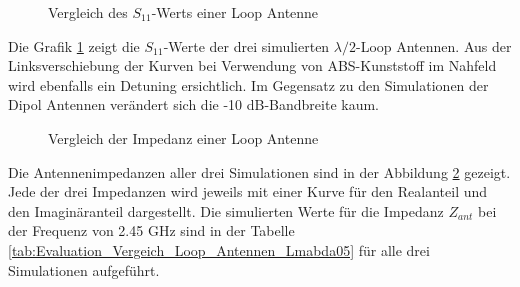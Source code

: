 \begin{figure}[t]
	\centering
	\begingroup
	
	\endgroup
	\caption{Vergleich des $S_{11}$-Werts einer Loop Antenne}
	\label{S11_Loop_Vergleich_Simulation}
\end{figure}

\newpage
Die Grafik \ref{S11_Loop_Vergleich_Simulation} zeigt die $S_{11}$-Werte der drei simulierten $\lambda/2$-Loop Antennen. Aus der Linksverschiebung der Kurven bei Verwendung von ABS-Kunststoff im Nahfeld wird ebenfalls ein Detuning ersichtlich. Im Gegensatz zu den Simulationen der Dipol Antennen verändert sich die -10 dB-Bandbreite kaum.
\begin{figure}[!ht]
	\centering
	\begingroup
	
	\endgroup
	\caption{Vergleich der Impedanz einer Loop Antenne}
	\label{Impedanz_Loop_Vergleich_Simulation}
\end{figure}

\newpage
Die Antennenimpedanzen aller drei Simulationen sind in der Abbildung \ref{Impedanz_Loop_Vergleich_Simulation} gezeigt. Jede der drei Impedanzen wird jeweils mit einer Kurve für den Realanteil und den Imaginäranteil dargestellt. Die simulierten Werte für die Impedanz $Z_{ant}$ bei der Frequenz von 2.45 GHz sind in der Tabelle \ref{tab:Evaluation_Vergeich_Loop_Antennen_Lmabda05} für alle drei Simulationen aufgeführt.

\clearpage
\newpage

